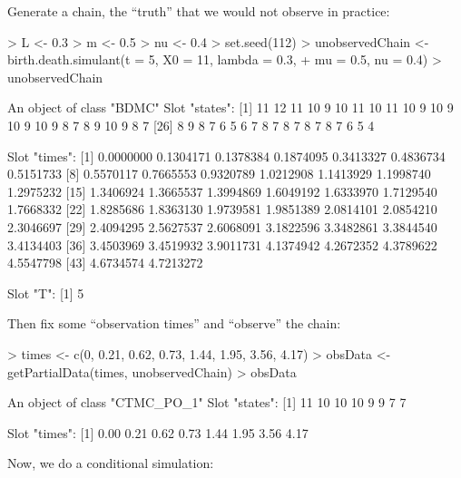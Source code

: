 \documentclass[12pt]{article}
\begin{document}
Generate a chain, the ``truth'' that we would not observe in practice:
\begin{Schunk}
\begin{Sinput}
> L <- 0.3
> m <- 0.5
> nu <- 0.4
> set.seed(112)
> unobservedChain <- birth.death.simulant(t = 5, X0 = 11, lambda = 0.3, 
+    mu = 0.5, nu = 0.4)
> unobservedChain
\end{Sinput}
\begin{Soutput}
An object of class "BDMC"
Slot "states":
 [1] 11 12 11 10  9 10 11 10 11 10  9 10  9 10  9 10  9  8  7  8  9 10  9  8  7
[26]  8  9  8  7  6  5  6  7  8  7  8  7  8  7  8  7  6  5  4

Slot "times":
 [1] 0.0000000 0.1304171 0.1378384 0.1874095 0.3413327 0.4836734 0.5151733
 [8] 0.5570117 0.7665553 0.9320789 1.0212908 1.1413929 1.1998740 1.2975232
[15] 1.3406924 1.3665537 1.3994869 1.6049192 1.6333970 1.7129540 1.7668332
[22] 1.8285686 1.8363130 1.9739581 1.9851389 2.0814101 2.0854210 2.3046697
[29] 2.4094295 2.5627537 2.6068091 3.1822596 3.3482861 3.3844540 3.4134403
[36] 3.4503969 3.4519932 3.9011731 4.1374942 4.2672352 4.3789622 4.5547798
[43] 4.6734574 4.7213272

Slot "T":
[1] 5
\end{Soutput}
\end{Schunk}
Then fix some ``observation times'' and ``observe'' the chain:
\begin{Schunk}
\begin{Sinput}
> times <- c(0, 0.21, 0.62, 0.73, 1.44, 1.95, 3.56, 4.17)
> obsData <- getPartialData(times, unobservedChain)
> obsData
\end{Sinput}
\begin{Soutput}
An object of class "CTMC_PO_1"
Slot "states":
[1] 11 10 10 10  9  9  7  7

Slot "times":
[1] 0.00 0.21 0.62 0.73 1.44 1.95 3.56 4.17
\end{Soutput}
\end{Schunk}
Now, we do a conditional simulation:
\end{document}
